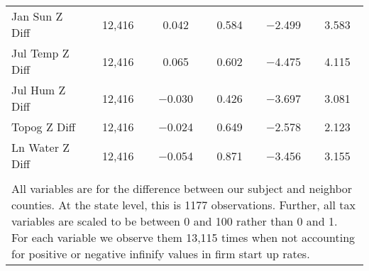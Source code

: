 \begin{table}[!htbp]
\begin{tabular}{@{\extracolsep{5pt}}lccccc}
Jan Sun Z Diff & 12,416 & 0.042 & 0.584 & $-$2.499 & 3.583 \\ 
Jul Temp Z Diff & 12,416 & 0.065 & 0.602 & $-$4.475 & 4.115 \\ 
Jul Hum Z Diff & 12,416 & $-$0.030 & 0.426 & $-$3.697 & 3.081 \\ 
Topog Z Diff & 12,416 & $-$0.024 & 0.649 & $-$2.578 & 2.123 \\ 
Ln Water Z Diff & 12,416 & $-$0.054 & 0.871 & $-$3.456 & 3.155 \\ 
\hline \\[-1.8ex] 
\multicolumn{6}{l}{All variables are for the difference between our subject and neighbor counties. At the state level, this is 1177 observations. Further, all tax variables are scaled to be between 0 and 100 rather than 0 and 1. For each variable we observe them 13,115 times when not accounting for positive or negative infinify values in firm start up rates.} \\ 
\end{tabular} 
\end{table} 
